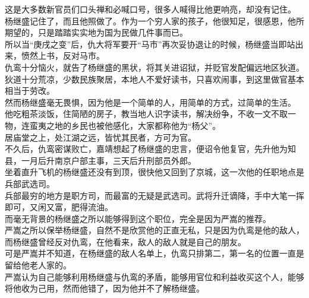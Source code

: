 \begin{multicols}{\theparacolNo}
这是大多数新官员们口头禅和必喊口号，很多人喊得比他更响亮，却没有记住。\\

杨继盛记住了，而且他照做了。作为一个穷人家的孩子，他很知足，很感恩，他所期望的，只是踏踏实实地为国为民做几件事而已。\\

所以当“庚戌之变”后，仇大将军要开“马市”再次妥协退让的时候，杨继盛当即站出来，愤然上书，反对马市。\\

仇鸾十分恼火，就告了杨继盛的黑状，将其关进诏狱，并贬官发配偏远地区狄道。\\

狄道十分荒凉，少数民族聚居，本地人不爱好读书，只喜欢闹事，到这里做官基本相当于劳改。\\

然而杨继盛毫无畏惧，因为他是一个简单的人，用简单的方式，过简单的生活。\\

他吃粗茶淡饭，住简陋的房子，教当地人识字读书，解决纷争，不收一文不取一物，连蛮夷之地的乡民也被他感化，大家都称他为“杨父”。\\

居庙堂之上，处江湖之远，皆忧其民者，方可为官。\\

不久后，仇鸾密谋败亡，嘉靖想起了杨继盛的忠言，便诏令他复官，先升他为知县，一月后升南京户部主事，三天后升刑部员外郎。\\

坐着直升飞机的杨继盛还没有到顶，很快他又回到了京城，这一次他的任职地点是兵部武选司。\\

兵部最穷的地方是职方司，而最富的无疑是武选司。武将升迁谪降，手中大笔一挥即可，又闲又富，肥得流油。\\

而毫无背景的杨继盛之所以能够得到这个职位，完全是因为严嵩的推荐。\\

严嵩之所以保举杨继盛，自然不是欣赏他的正直无私，只是因为仇鸾是他的敌人，而杨继盛曾经反对仇鸾，在他看来，敌人的敌人就是自己的朋友。\\

可是严嵩并不知道，在杨继盛的敌人名单上，仇鸾只排第二，第一名的位置一直是留给他老人家的。\\

严嵩认为自己能够利用杨继盛与仇鸾的矛盾，能够用官位和利益收买这个人，能够将他收为己用，然而他错了，因为他并不了解杨继盛。\\


\end{multicols}
